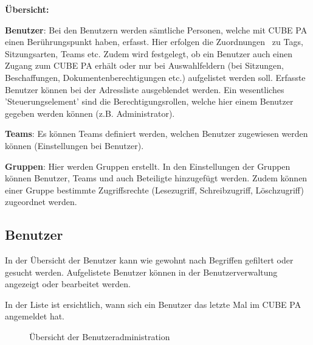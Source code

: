 \vspace{4cm}  

\textbf{Übersicht:}

\vspace{.3cm}  

\textbf{Benutzer}: Bei den Benutzern werden sämtliche Personen, welche mit CUBE PA einen Berührungspunkt haben, erfasst. Hier erfolgen die Zuordnungen \ zu Tags, Sitzungsarten, Teams etc. Zudem wird festgelegt, ob ein Benutzer auch einen Zugang zum CUBE PA erhält oder nur bei Auswahlfeldern (bei Sitzungen, Beschaffungen, Dokumentenberechtigungen etc.) aufgelistet werden soll. Erfasste Benutzer können bei der Adressliste ausgeblendet werden. Ein wesentliches 'Steuerungselement' sind die Berechtigungsrollen, welche hier einem Benutzer gegeben werden können (z.B. Administrator).

\vspace{\baselineskip}

\textbf{Teams}: Es können Teams definiert werden, welchen Benutzer zugewiesen werden können (Einstellungen bei Benutzer).

\vspace{\baselineskip}

\textbf{Gruppen}: Hier werden Gruppen erstellt. In den Einstellungen der Gruppen können Benutzer, Teams und auch Beteiligte hinzugefügt werden. Zudem können einer Gruppe bestimmte Zugriffsrechte (Lesezugriff, Schreibzugriff, Löschzugriff) zugeordnet werden.

\subsection{Benutzer}
\label{bkm:Ref445362390}

In der Übersicht der Benutzer kann wie gewohnt nach Begriffen gefiltert oder gesucht werden. Aufgelistete Benutzer können in der Benutzerverwaltung angezeigt oder bearbeitet werden. 

\vspace{\baselineskip}

In der Liste ist ersichtlich, wann sich ein Benutzer das letzte Mal im CUBE PA angemeldet hat. 

\begin{figure}[H]
\caption{Übersicht der Benutzeradministration}
\end{figure}

